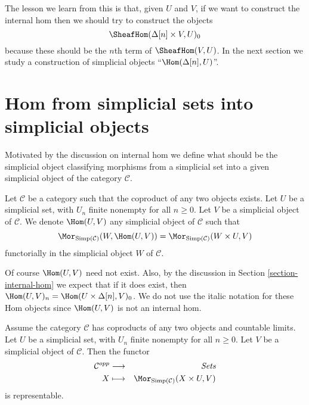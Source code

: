 \medskip\noindent
The lesson we learn from this is that, given $U$ and $V$,
if we want to construct the internal hom then we should try to
construct the objects
$$
\SheafHom(\Delta[n] \times V, U)_0
$$
because these should be the $n$th term of $\SheafHom(V, U)$.
In the next section we study a construction of simplicial objects
``$\Hom(\Delta[n], U)$''.


\section{Hom from simplicial sets into simplicial objects}
\label{section-hom-from-simplicial-sets}

\noindent
Motivated by the discussion on internal hom we define
what should be the simplicial object classifying
morphisms from a simplicial set into a given
simplicial object of the category $\mathcal{C}$.

\begin{definition}
\label{definition-hom-from-simplicial-set}
Let $\mathcal{C}$ be a category such that the coproduct
of any two objects exists.
Let $U$ be a simplicial set, with $U_n$ finite nonempty
for all $n \geq 0$.
Let $V$ be a simplicial object of $\mathcal{C}$.
We denote {\it $\Hom(U, V)$} any simplicial object of
$\mathcal{C}$ such that
$$
\Mor_{\text{Simp}(\mathcal{C})}(W, \Hom(U, V))
=
\Mor_{\text{Simp}(\mathcal{C})}(W \times U, V)
$$
functorially in the simplicial object $W$ of $\mathcal{C}$.
\end{definition}

\noindent
Of course $\Hom(U, V)$ need not exist.
Also, by the discussion in Section \ref{section-internal-hom}
we expect that if it does exist, then
$\Hom(U, V)_n = \Hom(U \times \Delta[n], V)_0$.
We do not use the italic notation for these Hom objects
since $\Hom(U, V)$ is not an internal hom.

\begin{lemma}
\label{lemma-exists-hom-0-from-simplicial-set}
Assume the category $\mathcal{C}$
has coproducts of any two objects and countable
limits. Let $U$ be a simplicial set, with $U_n$ finite nonempty
for all $n \geq 0$.
Let $V$ be a simplicial object of $\mathcal{C}$.
Then the functor
\begin{eqnarray*}
\mathcal{C}^{opp} & \longrightarrow & \textit{Sets} \\
X
& \longmapsto &
\Mor_{\text{Simp}(\mathcal{C})}(X \times U, V)
\end{eqnarray*}
is representable.
\end{lemma}

